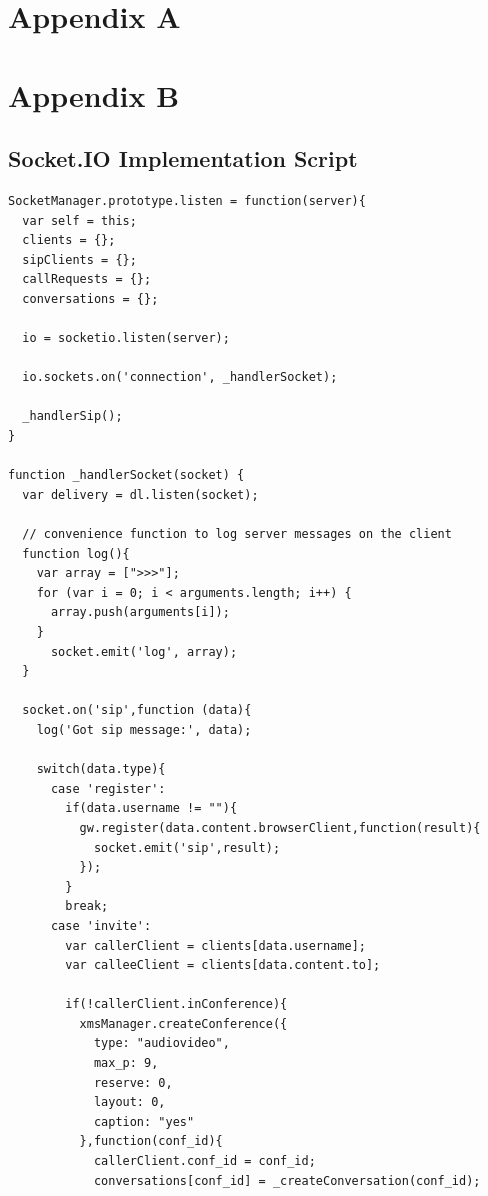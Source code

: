 \appendix
{}
 \renewcommand{\chaptername}{\appendixname}
 
\begin{appendices}

\chapter{Appendix A}

\chapter{Appendix B}

\section{Socket.IO Implementation Script} 
\label{server:socket}

\begin{lstlisting}[caption={socket.js on Application Server},label={code:server_socket}]
SocketManager.prototype.listen = function(server){
  var self = this;
  clients = {};
  sipClients = {};
  callRequests = {};
  conversations = {};

  io = socketio.listen(server);

  io.sockets.on('connection', _handlerSocket);

  _handlerSip();
}

function _handlerSocket(socket) {
  var delivery = dl.listen(socket);

  // convenience function to log server messages on the client
  function log(){
    var array = [">>>"];
    for (var i = 0; i < arguments.length; i++) {
      array.push(arguments[i]);
    }
      socket.emit('log', array);
  }

  socket.on('sip',function (data){
    log('Got sip message:', data);

    switch(data.type){
      case 'register':
        if(data.username != ""){
          gw.register(data.content.browserClient,function(result){
            socket.emit('sip',result);
          });
        }
        break;
      case 'invite':
        var callerClient = clients[data.username];
        var calleeClient = clients[data.content.to];

        if(!callerClient.inConference){
          xmsManager.createConference({
            type: "audiovideo",
            max_p: 9,
            reserve: 0,
            layout: 0,
            caption: "yes"
          },function(conf_id){
            callerClient.conf_id = conf_id;
            conversations[conf_id] = _createConversation(conf_id);


\end{lstlisting}
\end{appendices}
